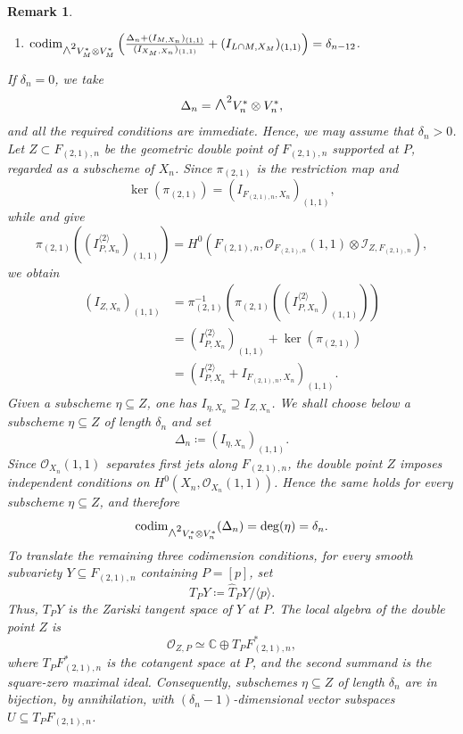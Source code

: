 \documentclass[a4paper,reqno]{amsart}
\theoremstyle{plainnopunct}
\theoremstyle{definitionnopunct}
\newtheorem{remark}[remark]{Remark}
\newcommand{\superwedge}{\mathlarger{\mathlarger{\wedge}}}
\newcommand{\C}{\mathbb{C}}
\newcommand{\cO}{\mathcal{O}}
\newcommand{\cI}{\mathcal{I}}
\newcommand{\codim}{\operatorname{codim}}
\begin{document}
\begin{remark}
\begin{enumerate}[leftmargin=*]
    \item
    $
    \codim_{\superwedge^2V_M^*\otimes V_M^*}
    \left(
    \frac{
    \Delta_n+(I_{M,X_n})_{(1,1)}
    }{
    (I_{X_M,X_n})_{(1,1)}
    }
    +
    (I_{L\cap M,X_M})_{(1,1)}
    \right)
    =
    \delta_{n-12}$.
\end{enumerate}
If $\delta_n=0$, we take
\[
\Delta_n
=
\superwedge^2V_n^*\otimes V_n^*,
\]
and all the required conditions are immediate. Hence, we may assume
that $\delta_n>0$.
Let
$Z\subset F_{(2,1),n}$
be the geometric double point of $F_{(2,1),n}$ supported at $P$, regarded as a
subscheme of $X_n$. Since $\pi_{(2,1)}$ is the restriction map and
\[
\ker(\pi_{(2,1)})
=
\left(
I_{F_{(2,1),n},X_n}
\right)_{(1,1)},
\]
while
 and 
give
\[
\pi_{(2,1)}
\left(
\left(
I_{P,X_n}^{\langle2\rangle}
\right)_{(1,1)}
\right)
=
H^0
\left(
F_{(2,1),n},
\cO_{F_{(2,1),n}}(1,1)
\otimes
\cI_{Z,F_{(2,1),n}}
\right),
\]
we obtain
\[
\begin{aligned}
\left(
I_{Z,X_n}
\right)_{(1,1)}
&=
\pi_{(2,1)}^{-1}
\left(
\pi_{(2,1)}
\left(
\left(
I_{P,X_n}^{\langle2\rangle}
\right)_{(1,1)}
\right)
\right)
\\
&=
\left(
I_{P,X_n}^{\langle2\rangle}
\right)_{(1,1)}
+
\ker(\pi_{(2,1)})
\\
&=
\left(
I_{P,X_n}^{\langle2\rangle}
+
I_{F_{(2,1),n},X_n}
\right)_{(1,1)}.
\end{aligned}
\]
Given a subscheme $\eta\subseteq Z$, one has
$I_{\eta,X_n}\supseteq I_{Z,X_n}$.
We shall choose below a subscheme
$\eta\subseteq Z$ of length $\delta_n$ and set
\[
\Delta_n
\coloneq
\left(
I_{\eta,X_n}
\right)_{(1,1)}.
\]
Since $\cO_{X_n}(1,1)$ separates first jets along
$F_{(2,1),n}$, the double point $Z$ imposes independent
conditions on $H^0(X_n,\cO_{X_n}(1,1))$. Hence the same holds
for every subscheme $\eta\subseteq Z$, and therefore
\[
\codim_{\superwedge^2V_n^*\otimes V_n^*}(\Delta_n)
=
\deg(\eta)
=
\delta_n.
\]
To translate the remaining three codimension conditions, for every
smooth subvariety
$Y\subseteq F_{(2,1),n}$
containing $P=[p]$, set
\[
T_PY
\coloneq
\widehat T_PY/\langle p\rangle.
\]
Thus, $T_PY$ is the Zariski tangent space of $Y$ at
$P$. The local algebra of the double point $Z$ is
\[
\cO_{Z,P}
\simeq
\C\oplus T_PF_{(2,1),n}^*,
\]
where $T_PF_{(2,1),n}^*$ is the cotangent space at
$P$, and the second summand is the square-zero maximal ideal.
Consequently, subschemes
$\eta\subseteq Z$ of length $\delta_n$ are in bijection, by
annihilation, with $(\delta_n-1)$-dimensional vector subspaces $U\subseteq T_PF_{(2,1),n}$.

\end{remark}
\end{document}
